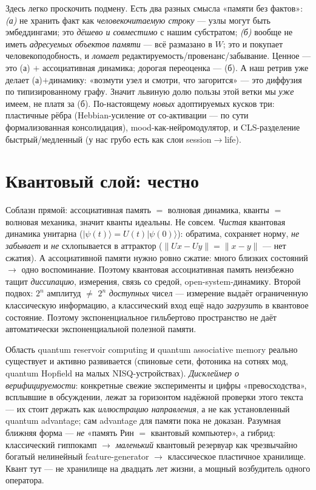 \begin{principle}[Ключевая развилка: «не хранить строки» $\ne$ «не иметь адресуемых узлов»}]
Здесь легко проскочить подмену. Есть два разных смысла «памяти без фактов»:
\emph{(а)} не хранить факт как \emph{человекочитаемую строку} — узлы могут быть эмбеддингами;
это \emph{дёшево и совместимо} с нашим субстратом; \emph{(б)} вообще не иметь \emph{адресуемых
объектов памяти} — всё размазано в $W$; это и покупает человекоподобность, и \emph{ломает}
редактируемость/провенанс/забывание. Ценное — это (а) $+$ ассоциативная динамика; дорогая
переоценка — (б). А наш ретрив уже делает (а)$+$динамику: «возмути узел и смотри, что
загорится» — это диффузия по типизированному графу. Значит львиную долю пользы этой ветки мы
\emph{уже} имеем, не платя за (б). По-настоящему \emph{новых} адоптируемых кусков три:
пластичные рёбра (Hebbian-усиление от со-активации — по сути формализованная консолидация),
mood-как-нейромодулятор, и CLS-разделение быстрый/медленный (у нас грубо есть как слои
session$\to$life).
\end{principle}

\section{Квантовый слой: честно}

Соблазн прямой: ассоциативная память $=$ волновая динамика, кванты $=$ волновая механика,
значит кванты идеальны. Не совсем. \emph{Чистая} квантовая динамика унитарна
($|\psi(t)\rangle=U(t)|\psi(0)\rangle$): обратима, сохраняет норму, \emph{не забывает} и
\emph{не} схлопывается в аттрактор ($\|Ux-Uy\|=\|x-y\|$ — нет сжатия). А ассоциативной памяти
нужно ровно сжатие: много близких состояний $\to$ одно воспоминание. Поэтому квантовая
ассоциативная память неизбежно тащит \emph{диссипацию}, измерения, связь со средой,
open-system-динамику. Второй подвох: $2^n$ амплитуд $\ne$ $2^n$ \emph{доступных} чисел —
измерение выдаёт ограниченную классическую информацию, а классический вход ещё надо
\emph{загрузить} в квантовое состояние. Поэтому экспоненциальное гильбертово пространство не
даёт автоматически экспоненциальной полезной памяти.

\begin{openq}
Область quantum reservoir computing и quantum associative memory реально существует и активно
развивается (спиновые сети, фотоника на сотнях мод, quantum Hopfield на малых NISQ-устройствах).
\emph{Дисклеймер о верифицируемости}: конкретные свежие эксперименты и цифры «превосходства»,
всплывшие в обсуждении, лежат за горизонтом надёжной проверки этого текста — их стоит держать
как \emph{иллюстрацию направления}, а не как установленный quantum advantage; сам advantage для
памяти пока не доказан. Разумная ближняя форма — \emph{не} «память Рин $=$ квантовый компьютер»,
а гибрид: классический гиппокамп $\to$ \emph{маленький} квантовый резервуар как чрезвычайно
богатый нелинейный feature-generator $\to$ классическое пластичное хранилище. Квант тут — не
хранилище на двадцать лет жизни, а мощный возбудитель одного оператора.
\end{openq}

